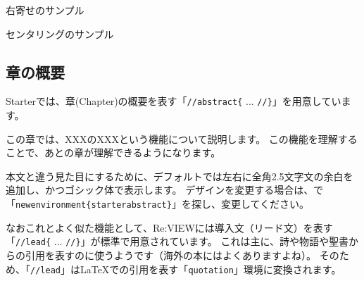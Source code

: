 \begin{starterprogram}\end{starterprogram}
\noindent
{}

\starterresult

\begin{flushright}
右寄せのサンプル
\end{flushright}

\begin{center}
センタリングのサンプル
\end{center}

\endstarterresult

\subsection*{章の概要}
\label{sec:1-1-14}

Starterでは、章(Chapter)の概要を表す「\texttt{//abstract\{} ... \texttt{//\}}」を用意しています。

\begin{starterprogram}\end{starterprogram}
\noindent
{}

\starterresult
\begin{starterabstract}
この章では、XXXのXXXという機能について説明します。
この機能を理解することで、あとの章が理解できるようになります。
\end{starterabstract}
\endstarterresult

本文と違う見た目にするために、デフォルトでは左右に全角2.5文字文の余白を追加し、かつゴシック体で表示します。
デザインを変更する場合は、で「\texttt{\reviewbackslash{}newenvironment\{starterabstract\}}」を探し、変更してください。

なおこれとよく似た機能として、Re:VIEWには導入文（リード文）を表す「\texttt{//lead\{} ... \texttt{//\}}」が標準で用意されています。
これは主に、詩や物語や聖書からの引用を表すのに使うようです（海外の本にはよくありますよね）。
そのため、「\texttt{//lead}」は\LaTeX{}での引用を表す「\texttt{quotation}」環境に変換されます。

\begin{starterprogram}\end{starterprogram}
\noindent
{}

